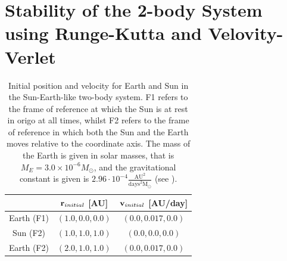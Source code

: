 \section{Stability of the 2-body System using Runge-Kutta and Velovity-Verlet}
\label{sec:stability2bodysystem}

\begin{table}[H]
\centering
\caption{
Initial position and velocity for Earth and Sun in the Sun-Earth-like two-body system. 
F1 refers to the frame of reference at which the Sun is at rest in origo at all times, whilst F2 refers to the frame of reference in which both the Sun and the Earth moves relative to the coordinate axis. 
The mass of the Earth is given in solar masses, that is $M_E = 3.0\times 10^{-6} M_{\odot}$, and the gravitational constant is given is $2.96\cdot 10^{-4} \frac{\textrm{AU}^2}{\textrm{days}^2 \textrm{M}_{\odot}}$ (see ).
}
\begin{center}
\begin{tabular}{ | c | c | c |  }
  \hline			
   &  $\mbox{\textbf{r}}_{initial}$ [AU] & $\mbox{\textbf{v}}_{initial}$ [AU/day]  
  \\ \hline
  Earth (F1) & $(1.0,0.0,0.0)$ & $(0.0,0.017,0.0)$
  \\ \hline
  Sun (F2) & $(1.0,1.0,1.0)$  & $(0.0,0.0,0.0)$ 
  \\ \hline
  Earth (F2)  & $(2.0,1.0,1.0)$ & $(0.0,0.017,0.0)$
  \\ \hline
\end{tabular}
\end{center}
\label{tab:SunEarthMarsTest}
\end{table}

